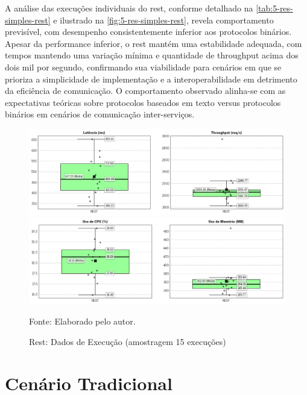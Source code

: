 A análise das execuções individuais do \gls{rest}, conforme detalhado na \autoref{tab:5-res-simples-rest} e ilustrado na \autoref{fig:5-res-simples-rest}, revela comportamento previsível, com desempenho consistentemente inferior aos protocolos binários. Apesar da performance inferior, o \gls{rest} mantém uma estabilidade adequada, com tempos mantendo uma variação mínima e quantidade de throughput acima dos dois mil por segundo, confirmando sua viabilidade para cenários em que se prioriza a simplicidade de implementação e a interoperabilidade em detrimento da eficiência de comunicação. O comportamento observado alinha-se com as expectativas teóricas sobre protocolos baseados em texto versus protocolos binários em cenários de comunicação inter-serviços.

\begin{figure}[H]
    \caption{Rest: Dados de Execução (amostragem 15 execuções)}
    \label{fig:5-res-simples-rest}
    \centering
    \includegraphics[width=1\linewidth]{imagens//resultados/5-resultados-simples-Rest-k6.png}
    \includegraphics[width=1\linewidth]{imagens//resultados/5-resultados-simples-Rest-prometheus.png}    
    {\par \raggedright \footnotesize Fonte: Elaborado pelo autor.\par}
\end{figure}



\section{Cenário Tradicional}

